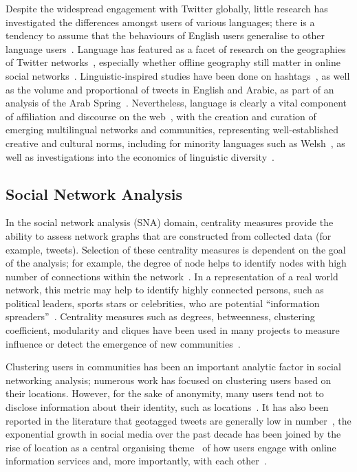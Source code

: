 \documentclass[conference]{IEEEtran}
\begin{document}
Despite the widespread engagement with Twitter globally, little
research has investigated the differences amongst users of various
languages; there is a tendency to assume that the behaviours of
English users generalise to other language
users~\cite{hong-et-al:2011}. Language has featured as a facet of
research on the geographies of Twitter
networks~\cite{takhteyev-et-al:2012}, especially whether offline
geography still matter in online social
networks~\cite{kulshrestha-et-al:2012}. Linguistic-inspired studies
have been done on hashtags~\cite{cunha-et-al:2011}, as well as the
volume and proportional of tweets in English and Arabic, as part of an
analysis of the Arab Spring~\cite{bruns-et-al:2013}. Nevertheless,
language is clearly a vital component of affiliation and discourse on
the web~\cite{zappavigna+martin:2012}, with the creation and curation
of emerging multilingual networks and communities, representing
well-established creative and cultural norms, including for minority
languages such as Welsh~\cite{gj+uj:2013}, as well as investigations
into the economics of linguistic
diversity~\cite{ginsburgh+weber:2011}.


\subsection{Social Network Analysis}

In the social network analysis (SNA) domain, centrality measures
provide the ability to assess network graphs that are constructed from
collected data (for example, tweets). Selection of these centrality
measures is dependent on the goal of the analysis; for example, the
degree of node helps to identify nodes with high number of connections
within the
network~\cite{borgatti+everett:2000,rombach-et-al:2014,liu-et-al:2014}.
In a representation of a real world network, this metric may help to
identify highly connected persons, such as political leaders, sports
stars or celebrities, who are potential ``information
spreaders''~\cite{cha-et-al:2012,borge-holthoefer-et-al:2012,zhang-et-al:2016}.
Centrality measures such as degrees, betweenness, clustering
coefficient, modularity and cliques have been used in many projects to
measure influence or detect the emergence of new
communities~\cite{willis-et-al:2015,oatley+crick:2015}.

Clustering users in communities has been an important analytic factor
in social networking analysis; numerous work has focused on clustering
users based on their locations. However, for the sake of anonymity,
many users tend not to disclose information about their identity, such
as locations~\cite{kang-et-al:2013}. It has also been reported in the
literature that geotagged tweets are generally low in
number~\cite{morstatter-et-al:2013,tan-et-al:2013,kumar-et-al:2014},
the exponential growth in social media over the past decade has been
joined by the rise of location as a central organising
theme~\cite{liang-et-al:2013} of how users engage with online
information services and, more importantly, with each
other~\cite{cheng-et-al:2010,caverlee-et-al:2013}.
\end{document}
